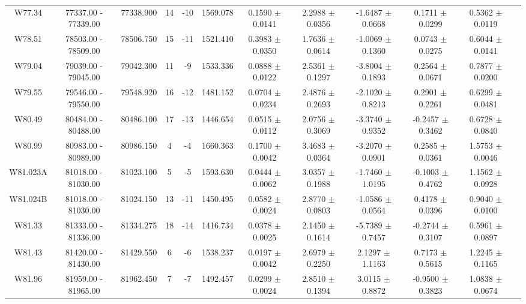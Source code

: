 \documentclass{article}
\begin{document}
\begin{table}[h]
{\begin{tabular}{|c|c|c|c|c|c|c|c|c|c|c|c|}
W77.34 & 77337.00 - 77339.00 & 77338.900 & 14 & -10 & 1569.078 & 0.1590 $\pm$ 0.0141 & 2.2988 $\pm$ 0.0356 & -1.6487 $\pm$ 0.0668 & 0.1711 $\pm$ 0.0299 & 0.5362 $\pm$ 0.0119 \\

W78.51 & 78503.00 - 78509.00 & 78506.750 & 15 & -11 & 1521.410 & 0.3983 $\pm$ 0.0350 & 1.7636 $\pm$ 0.0614 &  -1.0069 $\pm$ 0.1360 & 0.0743 $\pm$ 0.0275 & 0.6044 $\pm$ 0.0141 \\

W79.04 & 79039.00 - 79045.00 & 79042.300 & 11 & -9 & 1533.336 & 0.0888 $\pm$ 0.0122 & 2.5361 $\pm$ 0.1297 & -3.8004 $\pm$ 0.1893 & 0.2564 $\pm$ 0.0671 & 0.7877 $\pm$ 0.0200 \\

W79.55 & 79546.00 - 79550.00 & 79548.920 & 16 & -12 & 1481.152 & 0.0704 $\pm$ 0.0234 & 2.4876 $\pm$ 0.2693 &  -2.1020 $\pm$ 0.8213 & 0.2901 $\pm$ 0.2261 & 0.6299 $\pm$ 0.0481 \\

W80.49 & 80484.00 - 80488.00 & 80486.100 & 17 & -13 & 1446.654 & 0.0515 $\pm$ 0.0112 & 2.0756 $\pm$ 0.3069 &  -3.3740 $\pm$ 0.9352 & -0.2457 $\pm$ 0.3462 & 0.6728 $\pm$ 0.0840 \\

W80.99 & 80983.00 - 80989.00 & 80986.150 & 4 & -4 & 1660.363 & 0.1700 $\pm$ 0.0042 & 3.4683 $\pm$ 0.0364 &  -3.2070 $\pm$ 0.0901 & 0.2585 $\pm$ 0.0361 & 1.5753 $\pm$ 0.0046 \\

W81.023A & 81018.00 - 81030.00 & 81023.100 & 5 & -5 & 1593.630 & 0.0444 $\pm$ 0.0062 & 3.0357 $\pm$ 0.1988 &  -1.7460 $\pm$ 1.0195 & -0.1003 $\pm$ 0.4762 & 1.1562 $\pm$ 0.0928 \\

W81.024B & 81018.00 - 81030.00 & 81024.150 & 13 & -11 & 1450.495 & 0.0582 $\pm$ 0.0024 &  2.8770 $\pm$ 0.0803 & -1.0586 $\pm$ 0.0564 & 0.4178 $\pm$ 0.0396 & 0.9040 $\pm$ 0.0100 \\
         
W81.33 & 81333.00 - 81336.00 & 81334.275 & 18 & -14 & 1416.734 & 0.0378 $\pm$ 0.0025 & 2.1450 $\pm$ 0.1614 & -5.7389 $\pm$ 0.7457 & -0.2744 $\pm$ 0.3107 & 0.5961 $\pm$ 0.0897 \\

W81.43 & 81420.00 - 81430.00 & 81429.550 & 6 & -6 & 1538.237 & 0.0197 $\pm$ 0.0042 & 2.6979 $\pm$ 0.2250 &  2.1297 $\pm$ 1.1163 & 0.7173 $\pm$ 0.5615 & 1.2245 $\pm$ 0.1165 \\

W81.96 & 81959.00 - 81965.00 & 81962.450 & 7 & -7 & 1492.457 & 0.0299 $\pm$ 0.0024 & 2.8510 $\pm$ 0.1394 &  3.0115 $\pm$ 0.8872 & -0.9500 $\pm$ 0.3823 & 1.0838 $\pm$ 0.0674 \\


\end{tabular}}
\end{table}
\end{document}
